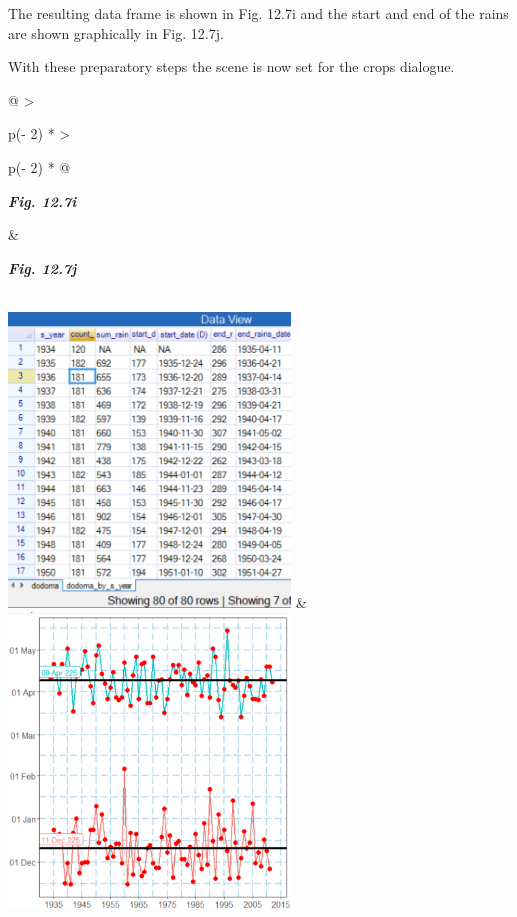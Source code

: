 \documentclass[
  letterpaper,
  DIV=11,
  numbers=noendperiod]{scrreprt}
\begin{document}
The resulting data frame is shown in Fig. 12.7i and the start and end of
the rains are shown graphically in Fig. 12.7j.

With these preparatory steps the scene is now set for the crops
dialogue.

\begin{longtable}[]{@{}
  >{\raggedright\arraybackslash}p{(\columnwidth - 2\tabcolsep) * }
  >{\raggedright\arraybackslash}p{(\columnwidth - 2\tabcolsep) * }@{}}
\toprule\noalign{}
\begin{minipage}[b]{\linewidth}\raggedright
\textbf{\emph{Fig. 12.7i}}
\end{minipage} & \begin{minipage}[b]{\linewidth}\raggedright
\textbf{\emph{Fig. 12.7j}}
\end{minipage} \\
\midrule\noalign{}
\endhead
\bottomrule\noalign{}
\endlastfoot
\includegraphics[width=2.95183in,height=3.08248in]{figures/Fig12.7i.png}
&
\includegraphics[width=2.94268in,height=3.08856in]{figures/Fig12.7j.png} \\
\end{longtable}
\end{document}

